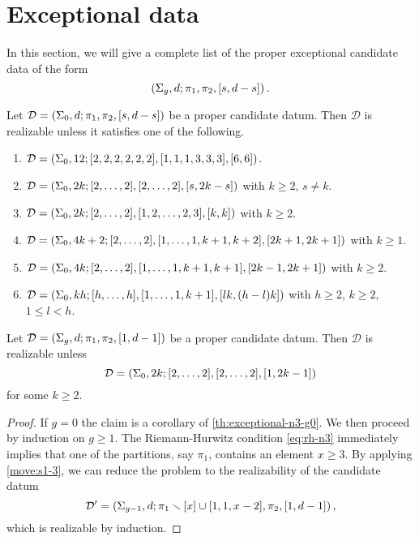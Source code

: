 \documentclass{article}
\begin{document}
\section{Exceptional data}
In this section, we will give a complete list of the proper exceptional candidate data of the form
\[
\left(\Sigma_g,d;\pi_1,\pi_2,[s,d-s]\right).
\]

\begin{theorem}\label{th:exceptional-n3-g0}
Let $\mathcal{D}=\left(\Sigma_0,d;\pi_1,\pi_2,[s,d-s]\right)$ be a proper candidate datum. Then $\mathcal{D}$ is realizable unless it satisfies one of the following.
\begin{enumerate}
\item $\mathcal{D}=\left(\Sigma_0,12;[2,2,2,2,2,2],[1,1,1,3,3,3],[6,6]\right)$.
\item $\mathcal{D}=\left(\Sigma_0,2k;[2,\ldots,2],[2,\ldots,2],[s,2k-s]\right)$ with $k\ge 2$, $s\neq k$.
\item $\mathcal{D}=\left(\Sigma_0,2k;[2,\ldots,2],[1,2,\ldots,2,3],[k,k]\right)$ with $k\ge2$.
\item $\mathcal{D}=\left(\Sigma_0,4k+2;[2,\ldots,2],[1,\ldots,1,k+1,k+2],[2k+1,2k+1]\right)$ with $k\ge 1$.
\item $\mathcal{D}=\left(\Sigma_0,4k;[2,\ldots,2],[1,\ldots,1,k+1,k+1],[2k-1,2k+1]\right)$ with $k\ge2$.
\item $\mathcal{D}=\left(\Sigma_0,kh;[h,\ldots,h],[1,\ldots,1,k+1],[lk,(h-l)k]\right)$ with $h\ge 2$, $k\ge 2$, $1\le l<h$.
\end{enumerate}
\end{theorem}

\begin{lemma}\label{th:exceptional-n3-s1}
Let $\mathcal{D}=\left(\Sigma_g,d;\pi_1,\pi_2,[1,d-1]\right)$ be a proper candidate datum. Then $\mathcal{D}$ is realizable unless
\[
\mathcal{D}=\left(\Sigma_0,2k;[2,\ldots,2],[2,\ldots,2],[1,2k-1]\right)
\]
for some $k\ge 2$.
\end{lemma}
\begin{proof}
If $g=0$ the claim is a corollary of \cref{th:exceptional-n3-g0}. We then proceed by induction on $g\ge 1$. The Riemann-Hurwitz condition \eqref{eq:rh-n3} immediately implies that one of the partitions, say $\pi_1$, contains an element $x\ge 3$. By applying \cref{move:s1-3}, we can reduce the problem to the realizability of the candidate datum
\[
\mathcal{D}'=\left(\Sigma_{g-1},d;\pi_1\smallsetminus[x]\cup[1,1,x-2],\pi_2,[1,d-1]\right),
\]
which is realizable by induction.
\end{proof}
\end{document}

